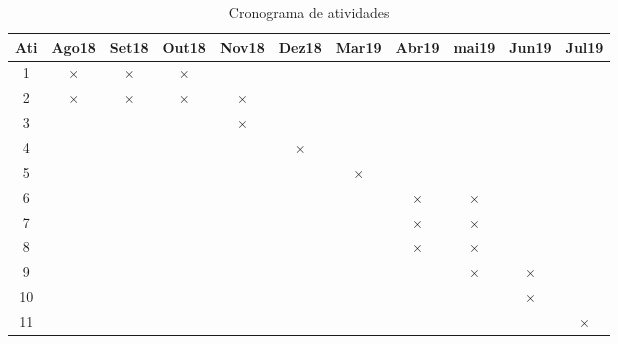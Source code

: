 \label{chapter:cronograma}
\begin{table}[htbp]
  \centering
  \caption{Cronograma de atividades}
  \label{tab:cronograma}
  \begin{tabular}{|c|c|c|c|c|c|c|c|c|c|c|}
    \hline
    \textbf{Ati} & \textbf{Ago18} & \textbf{Set18} & \textbf{Out18} & \textbf{Nov18} & \textbf{Dez18} & \textbf{Mar19} & \textbf{Abr19} & \textbf{mai19} & \textbf{Jun19} & \textbf{Jul19} \\
    \hline
    1 & \(\times\) & \(\times\) & \(\times\) & & & & & & & \\ \hline
    2 & \(\times\) & \(\times\) & \(\times\) & \(\times\) & & & & & & \\ \hline
    3 & & & & \(\times\) & & & & & & \\ \hline
    4 & & & & & \(\times\) & & & & & \\ \hline
    5 & & & & & & \(\times\) & & & & \\ \hline
    6 & & & & & & & \(\times\) & \(\times\) & & \\ \hline
    7 & & & & & & & \(\times\) & \(\times\) & & \\ \hline
    8 & & & & & & & \(\times\) & \(\times\) & & \\ \hline
    9 & & & & & & & & \(\times\) & \(\times\) & \\ \hline
    10 & & & & & & & & & \(\times\) & \\ \hline
    11 & & & & & & & & & & \(\times\) \\ \hline 
  \end{tabular}
\end{table}

